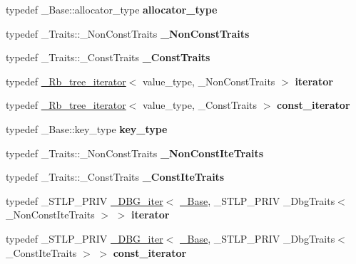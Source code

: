 \begin{DoxyCompactItemize}
typedef \+\_\+\+Base\+::allocator\+\_\+type {\bfseries allocator\+\_\+type}
\item 
\mbox{\label{class___rb__tree_a0f18450b3939f9b0f327c462147d9df0}} 
typedef \+\_\+\+Traits\+::\+\_\+\+Non\+Const\+Traits {\bfseries \+\_\+\+Non\+Const\+Traits}
\item 
\mbox{\label{class___rb__tree_a799d3ddc6b124de99245d82894414061}} 
typedef \+\_\+\+Traits\+::\+\_\+\+Const\+Traits {\bfseries \+\_\+\+Const\+Traits}
\item 
\mbox{\label{class___rb__tree_af97151c593ea3e77a7acf5ab762f43b6}} 
typedef \hyperlink{struct___rb__tree__iterator}{\+\_\+\+Rb\+\_\+tree\+\_\+iterator}$<$ value\+\_\+type, \+\_\+\+Non\+Const\+Traits $>$ {\bfseries iterator}
\item 
\mbox{\label{class___rb__tree_a75b16825233d9200e1d039df9cf53115}} 
typedef \hyperlink{struct___rb__tree__iterator}{\+\_\+\+Rb\+\_\+tree\+\_\+iterator}$<$ value\+\_\+type, \+\_\+\+Const\+Traits $>$ {\bfseries const\+\_\+iterator}
\item 
\mbox{\label{class___rb__tree_a68c0aa7eba3808f8bf3479895496e702}} 
typedef \+\_\+\+Base\+::key\+\_\+type {\bfseries key\+\_\+type}
\item 
\mbox{\label{class___rb__tree_a37911dd525d0a1711df02954524becbf}} 
typedef \+\_\+\+Traits\+::\+\_\+\+Non\+Const\+Traits {\bfseries \+\_\+\+Non\+Const\+Ite\+Traits}
\item 
\mbox{\label{class___rb__tree_a0e26226e8d51245dc6b9e342a95deb58}} 
typedef \+\_\+\+Traits\+::\+\_\+\+Const\+Traits {\bfseries \+\_\+\+Const\+Ite\+Traits}
\item 
\mbox{\label{class___rb__tree_a97cda42ec8a27029ee0e789c10ddef77}} 
typedef \+\_\+\+S\+T\+L\+P\+\_\+\+P\+R\+IV \hyperlink{struct___d_b_g__iter}{\+\_\+\+D\+B\+G\+\_\+iter}$<$ \hyperlink{class___rb__tree__base}{\+\_\+\+Base}, \+\_\+\+S\+T\+L\+P\+\_\+\+P\+R\+IV \+\_\+\+Dbg\+Traits$<$ \+\_\+\+Non\+Const\+Ite\+Traits $>$ $>$ {\bfseries iterator}
\item 
\mbox{\label{class___rb__tree_a0875efb53d91523df4620cb5976be57a}} 
typedef \+\_\+\+S\+T\+L\+P\+\_\+\+P\+R\+IV \hyperlink{struct___d_b_g__iter}{\+\_\+\+D\+B\+G\+\_\+iter}$<$ \hyperlink{class___rb__tree__base}{\+\_\+\+Base}, \+\_\+\+S\+T\+L\+P\+\_\+\+P\+R\+IV \+\_\+\+Dbg\+Traits$<$ \+\_\+\+Const\+Ite\+Traits $>$ $>$ {\bfseries const\+\_\+iterator}
\end{DoxyCompactItemize}
